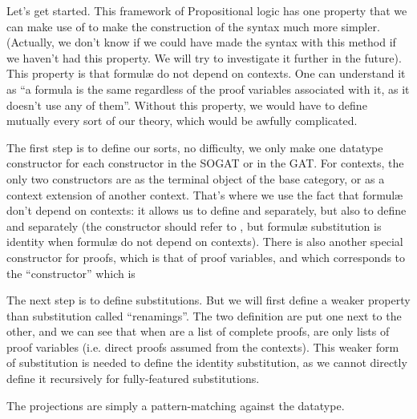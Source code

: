 \documentclass[10pt,a4paper]{article}
\begin{document}
			Let's get started. This framework of Propositional logic has one property that we can make use of to make the construction of the syntax much more simpler. (Actually, we don't know if we could have made the syntax with this method if we haven't had this property. We will try to investigate it further in the future). This property is that formulæ do not depend on contexts. One can understand it as \enquote{a formula is the same regardless of the proof variables associated with it, as it doesn't use any of them}. Without this property, we would have to define mutually every sort of our theory, which would be awfully complicated.
			
			The first step is to define our sorts, no difficulty, we only make one datatype constructor for each constructor in the SOGAT or in the GAT. For contexts, the only two constructors are as the terminal object of the base category, or as a context extension of another context. That's where we use the fact that formulæ don't depend on contexts: it allows us to define  and  separately, but also to define  and  separately (the  constructor should refer to , but formulæ substitution is identity when formulæ do not depend on contexts). There is also another special constructor for proofs, which is that of proof variables, and which corresponds to the \enquote{constructor} which is 
			
			\begin{tcolorbox}
				\agdasep
			\end{tcolorbox}
		
			The next step is to define substitutions. But we will first define a weaker property than substitution called \enquote{renamings}. The two definition are put one next to the other, and we can see that when  are a list of complete proofs,  are only lists of proof variables (i.e. direct proofs assumed from the contexts). This weaker form of substitution is needed to define the identity substitution, as we cannot directly define it recursively for fully-featured substitutions.
			
			The projections are simply a pattern-matching against the datatype.
			
			\begin{tcolorbox}
				\agda{agda/ZOL-I-4.tex}
				\agdasep
				\agda{agda/ZOL-I-6.tex}
				\vspace{0ex}
				\agda{agda/ZOL-I-7.tex}
			\end{tcolorbox}
		
\end{document}
